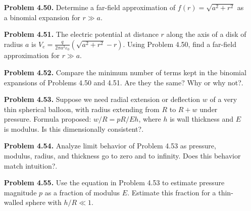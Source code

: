 \begin{enumerate}
    \item[\textbf{Problem 4.50.}] Determine a far-field approximation of $f(r)=\sqrt{a^2+r^2}$ as a binomial expansion for $r \gg a$.
    \item[\textbf{Problem 4.51.}] The electric potential at distance $r$ along the axis of a disk of radius $a$ is $V_e = \frac{q}{2\pi a^2 \varepsilon_0}(\sqrt{a^2 + r^2} - r)$. Using Problem 4.50, find a far-field approximation for $r \gg a$.
    \item[\textbf{Problem 4.52.}] Compare the minimum number of terms kept in the binomial expansions of Problems 4.50 and 4.51. Are they the same? Why or why not?.
    \item[\textbf{Problem 4.53.}] Suppose we need radial extension or deflection $w$ of a very thin spherical balloon, with radius extending from $R$ to $R+w$ under pressure. Formula proposed: $w/R = pR/Eh$, where $h$ is wall thickness and $E$ is modulus. Is this dimensionally consistent?.
    \item[\textbf{Problem 4.54.}] Analyze limit behavior of Problem 4.53 as pressure, modulus, radius, and thickness go to zero and to infinity. Does this behavior match intuition?.
    \item[\textbf{Problem 4.55.}] Use the equation in Problem 4.53 to estimate pressure magnitude $p$ as a fraction of modulus $E$. Estimate this fraction for a thin-walled sphere with $h/R \ll 1$.
\end{enumerate}
